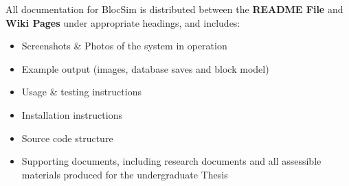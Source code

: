 All documentation for BlocSim is distributed between the \textbf{README File} and \textbf{Wiki Pages} under appropriate headings, and includes:
\begin{itemize}
\item Screenshots \& Photos of the system in operation
\item Example output (images, database saves and block model)
\item Usage \& testing instructions
\item Installation instructions
\item Source code structure
\item Supporting documents, including research documents and all assessible materials produced for the undergraduate Thesis
\end{itemize}




\clearpage





